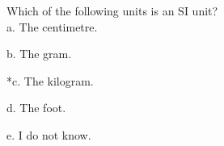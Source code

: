 
Which of the following units is an SI unit?\\

a. The centimetre.

b. The gram.

*c. The kilogram.

d. The foot.

e. I do not know.\\
